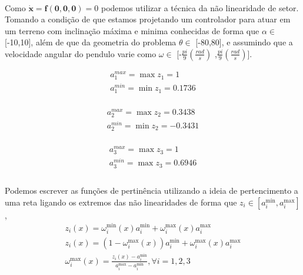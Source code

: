 \documentclass[a4paper,10pt]{article}
\begin{document}
\paragraph{} Como $\dot{\bm{x}} = \bm{f(0,0,0)} = 0$ podemos utilizar a técnica da não linearidade de setor. Tomando a condição de que estamos projetando um controlador para atuar em um terreno com inclinação máxima e minima conhecidas de forma que $\alpha \in$ [-10\textdegree ,10\textdegree], além de que da geometria do problema $\theta \in$ [-80\textdegree ,80\textdegree], e assumindo que a velocidade angular do pendulo varie como $\omega \in$ [-$\frac{pi}{9}(\frac{rad}{s})$ ,$\frac{pi}{9}(\frac{rad}{s})$].


\noindent \begin{minipage}{.25 \linewidth}
\begin{gather}
	a_{1}^{max} = \max z_1 =  1 \\
	a_{1}^{min} = \min z_1  = 0.1736 \\	
\end{gather}
\end{minipage}
\hfill
 \begin{minipage}{.25 \linewidth}
	\begin{gather}
		a_{2}^{max} = \max z_2 =  0.3438 \\
		a_{2}^{min} = \min z_2 = -0.3431 \\	
	\end{gather}
\end{minipage}
\hfill
\begin{minipage}{.25 \linewidth}
	\begin{gather}
		a_{3}^{max} =  \max z_3 = 1 \\
		a_{3}^{min} = \max z_3 = 0.6946 \\	
	\end{gather}
\end{minipage}
\paragraph{}Podemos escrever as funções de pertinência utilizando a ideia de pertencimento a uma reta ligando os extremos das não linearidades de forma que $z_i \in [a_i^{\min},a_i^{\max}]$,
\begin{gather}
		z_i(x) = \omega_{i}^{\min}(x) a_i^{\min} + \omega_{i}^{\max}(x) a_i^{\max} \\
	z_i(x) = (1 -\omega_{i}^{\max}(x) ) a_i^{\min} + \omega_{i}^{\max}(x)a_i^{\max} \\
	 \boxed{\omega_{i}^{\max}(x) = \frac{z_i(x) - a_i^{\min}}{a_i^{\max} - a_i^{\min}} , \forall{i=1,2,3}} 
\end{gather}
\end{document}
